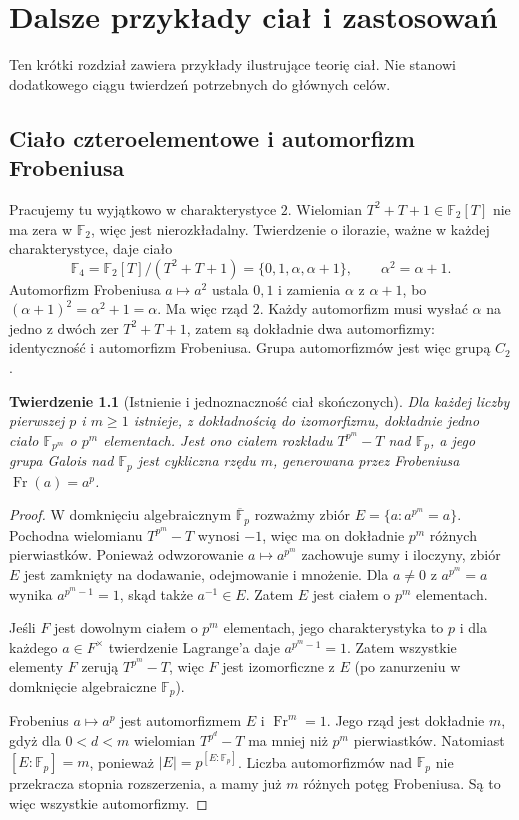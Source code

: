 \documentclass[11pt,a4paper,oneside]{book}
\numberwithin{equation}{section}
\theoremstyle{plain}
\newtheorem{twierdzenie}{Twierdzenie}[chapter]
\theoremstyle{definition}
\theoremstyle{remark}
\newcommand{\F}{\mathbb{F}}
\begin{document}
\chapter{Dalsze przykłady ciał i zastosowań}

Ten krótki rozdział zawiera przykłady ilustrujące teorię ciał. Nie stanowi dodatkowego ciągu twierdzeń potrzebnych do głównych celów.

\section{Ciało czteroelementowe i automorfizm Frobeniusa}

Pracujemy tu wyjątkowo w charakterystyce $2$. Wielomian $T^2+T+1\in\F_2[T]$ nie ma zera w $\F_2$, więc jest nierozkładalny. Twierdzenie o ilorazie, ważne w każdej charakterystyce, daje ciało
\[
\F_4=\F_2[T]/(T^2+T+1)=\{0,1,\alpha,\alpha+1\},\qquad \alpha^2=\alpha+1.
\]
Automorfizm Frobeniusa $a\mapsto a^2$ ustala $0,1$ i zamienia $\alpha$ z $\alpha+1$, bo $(\alpha+1)^2=\alpha^2+1=\alpha$. Ma więc rząd $2$. Każdy automorfizm musi wysłać $\alpha$ na jedno z dwóch zer $T^2+T+1$, zatem są dokładnie dwa automorfizmy: identyczność i automorfizm Frobeniusa. Grupa automorfizmów jest więc grupą $C_2$.

\begin{twierdzenie}[Istnienie i jednoznaczność ciał skończonych]
Dla każdej liczby pierwszej $p$ i $m\ge1$ istnieje, z dokładnością do izomorfizmu, dokładnie jedno ciało $\F_{p^m}$ o $p^m$ elementach. Jest ono ciałem rozkładu $T^{p^m}-T$ nad $\F_p$, a jego grupa Galois nad $\F_p$ jest cykliczna rzędu $m$, generowana przez Frobeniusa $\operatorname{Fr}(a)=a^p$.
\end{twierdzenie}
\begin{proof}
W domknięciu algebraicznym $\overline{\F}_p$ rozważmy zbiór $E=\{a:a^{p^m}=a\}$. Pochodna wielomianu $T^{p^m}-T$ wynosi $-1$, więc ma on dokładnie $p^m$ różnych pierwiastków. Ponieważ odwzorowanie $a\mapsto a^{p^m}$ zachowuje sumy i iloczyny, zbiór $E$ jest zamknięty na dodawanie, odejmowanie i mnożenie. Dla $a\ne0$ z $a^{p^m}=a$ wynika $a^{p^m-1}=1$, skąd także $a^{-1}\in E$. Zatem $E$ jest ciałem o $p^m$ elementach.

Jeśli $F$ jest dowolnym ciałem o $p^m$ elementach, jego charakterystyka to $p$ i dla każdego $a\in F^\times$ twierdzenie Lagrange'a daje $a^{p^m-1}=1$. Zatem wszystkie elementy $F$ zerują $T^{p^m}-T$, więc $F$ jest izomorficzne z $E$ (po zanurzeniu w domknięcie algebraiczne $\F_p$).

Frobenius $a\mapsto a^p$ jest automorfizmem $E$ i $\operatorname{Fr}^m=1$. Jego rząd jest dokładnie $m$, gdyż dla $0<d<m$ wielomian $T^{p^d}-T$ ma mniej niż $p^m$ pierwiastków. Natomiast $[E:\F_p]=m$, ponieważ $|E|=p^{[E:\F_p]}$. Liczba automorfizmów nad $\F_p$ nie przekracza stopnia rozszerzenia, a mamy już $m$ różnych potęg Frobeniusa. Są to więc wszystkie automorfizmy.
\end{proof}
\end{document}
